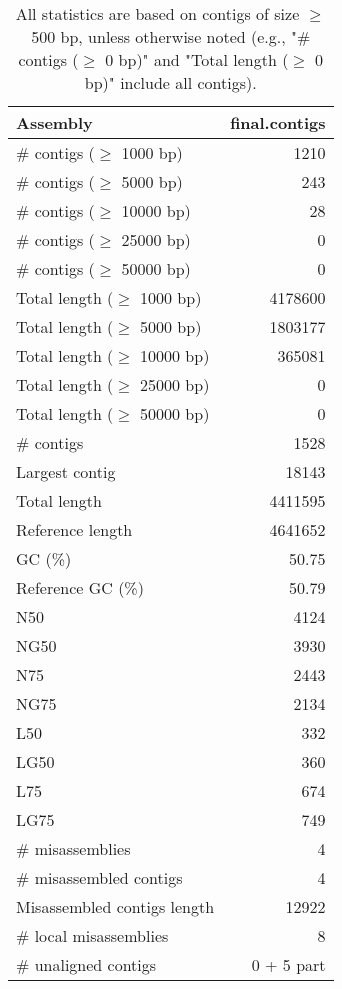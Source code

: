 \documentclass[12pt,a4paper]{article}
\begin{document}
\begin{table}[ht]
\begin{center}
\caption{All statistics are based on contigs of size $\geq$ 500 bp, unless otherwise noted (e.g., "\# contigs ($\geq$ 0 bp)" and "Total length ($\geq$ 0 bp)" include all contigs).}
\begin{tabular}{|l*{1}{|r}|}
\hline
Assembly & final.contigs \\ \hline
\# contigs ($\geq$ 1000 bp) & 1210 \\ \hline
\# contigs ($\geq$ 5000 bp) & 243 \\ \hline
\# contigs ($\geq$ 10000 bp) & 28 \\ \hline
\# contigs ($\geq$ 25000 bp) & 0 \\ \hline
\# contigs ($\geq$ 50000 bp) & 0 \\ \hline
Total length ($\geq$ 1000 bp) & 4178600 \\ \hline
Total length ($\geq$ 5000 bp) & 1803177 \\ \hline
Total length ($\geq$ 10000 bp) & 365081 \\ \hline
Total length ($\geq$ 25000 bp) & 0 \\ \hline
Total length ($\geq$ 50000 bp) & 0 \\ \hline
\# contigs & 1528 \\ \hline
Largest contig & 18143 \\ \hline
Total length & 4411595 \\ \hline
Reference length & 4641652 \\ \hline
GC (\%) & 50.75 \\ \hline
Reference GC (\%) & 50.79 \\ \hline
N50 & 4124 \\ \hline
NG50 & 3930 \\ \hline
N75 & 2443 \\ \hline
NG75 & 2134 \\ \hline
L50 & 332 \\ \hline
LG50 & 360 \\ \hline
L75 & 674 \\ \hline
LG75 & 749 \\ \hline
\# misassemblies & 4 \\ \hline
\# misassembled contigs & 4 \\ \hline
Misassembled contigs length & 12922 \\ \hline
\# local misassemblies & 8 \\ \hline
\# unaligned contigs & 0 + 5 part \\ \hline

\end{tabular}
\end{center}
\end{table}
\end{document}
